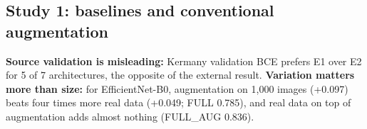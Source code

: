 \documentclass[11pt,a4paper]{article}
\begin{document}
\subsection{Study 1: baselines and conventional augmentation}
\begin{table}[h]\centering\small
{}
\caption{Study 1, mean of 3 seeds. Every model loses 0.15--0.20 AUROC from Kermany test to RSNA. Augmentation helps every architecture (+0.05 to +0.10, all CIs above 0); erasing is the best recipe for five of seven.}\label{tab:s1}
\end{table}
\textbf{Source validation is misleading:} Kermany validation BCE prefers E1 over E2 for 5 of 7 architectures, the opposite of the external result. \textbf{Variation matters more than size:} for EfficientNet-B0, augmentation on 1{,}000 images (+0.097) beats four times more real data (+0.049; FULL 0.785), and real data on top of augmentation adds almost nothing (FULL\_AUG 0.836).
\end{document}
